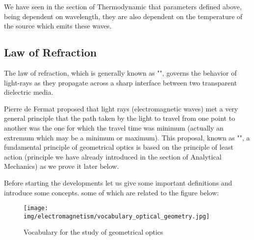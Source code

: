 	\begin{tcolorbox}[title=Remark,colframe=black,arc=10pt]
	 We have seen in the section of Thermodynamic that parameters defined above, being dependent on wavelength, they are also dependent on the temperature of the source which emits these waves.
	\end{tcolorbox}
	
	\subsection{Law of Refraction}
	The law of refraction, which is generally known as "", governs the behavior of light-rays as they propagate across a sharp interface between two transparent dielectric media.

	Pierre de Fermat proposed that light rays (electromagnetic waves) met a very general principle that the path taken by the light to travel from one point to another was the one for which the travel time was minimum (actually an extremum which may be a minimum or maximum). This proposal, known as "", a fundamental principle of geometrical optics is based on the principle of least action (principle we have already introduced in the section of Analytical Mechanics) as we prove it later below.

	Before starting the developments let us give some important definitions and introduce some concepts. some of which are related to the figure below:
	\begin{figure}[H]
		\centering
		\texttt{[image: img/electromagnetism/vocabulary\_optical\_geometry.jpg]}
		\caption{Vocabulary for the study of geometrical optics}
	\end{figure}
	
